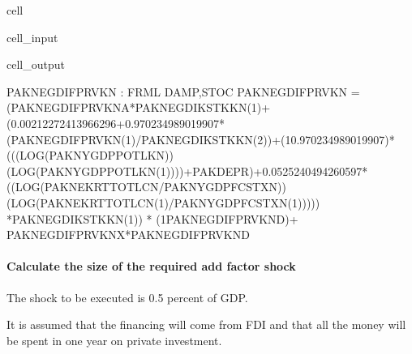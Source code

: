 \documentclass[letterpaper,10pt,english]{jupyterBook}
\begin{document}
\begin{sphinxuseclass}{cell}\begin{sphinxVerbatimInput}

\begin{sphinxuseclass}{cell_input}
\begin{sphinxVerbatim}[commandchars=\\\{\}]
\PYG{p}{[}\PYG{p}{]}
\end{sphinxVerbatim}

\end{sphinxuseclass}\end{sphinxVerbatimInput}
\begin{sphinxVerbatimOutput}

\begin{sphinxuseclass}{cell_output}
\begin{sphinxVerbatim}[commandchars=\\\{\}]
PAKNEGDIFPRVKN : FRML \PYGZlt{}DAMP,STOC\PYGZgt{} PAKNEGDIFPRVKN = (PAKNEGDIFPRVKN\PYGZus{}A*PAKNEGDIKSTKKN(\PYGZhy{}1)+ (0.00212272413966296+0.970234989019907*(PAKNEGDIFPRVKN(\PYGZhy{}1)/PAKNEGDIKSTKKN(\PYGZhy{}2))+(1\PYGZhy{}0.970234989019907)*(((LOG(PAKNYGDPPOTLKN))\PYGZhy{}(LOG(PAKNYGDPPOTLKN(\PYGZhy{}1))))+PAKDEPR)+0.0525240494260597*((LOG(PAKNEKRTTOTLCN/PAKNYGDPFCSTXN))\PYGZhy{}(LOG(PAKNEKRTTOTLCN(\PYGZhy{}1)/PAKNYGDPFCSTXN(\PYGZhy{}1))))) *PAKNEGDIKSTKKN(\PYGZhy{}1)) * (1\PYGZhy{}PAKNEGDIFPRVKN\PYGZus{}D)+ PAKNEGDIFPRVKN\PYGZus{}X*PAKNEGDIFPRVKN\PYGZus{}D \PYGZdl{}
\end{sphinxVerbatim}

\end{sphinxuseclass}\end{sphinxVerbatimOutput}

\end{sphinxuseclass}

\paragraph{Calculate the size of the required add factor shock}
\label{\detokenize{content/05_WBModels/ScenarioAnalysis:calculate-the-size-of-the-required-add-factor-shock}}
\sphinxAtStartPar
The shock to be executed is 0.5 percent of GDP.

\sphinxAtStartPar
It is assumed that the financing will come from FDI and that all the money will be spent in one year on private investment.
\end{document}
